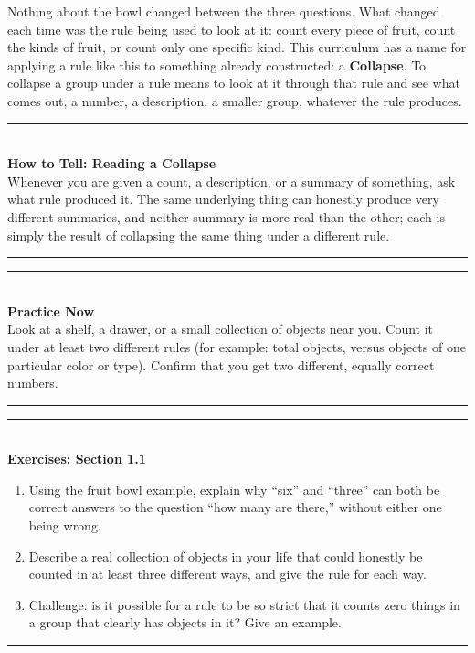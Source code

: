 \documentclass[11pt]{book}
\newenvironment{algorithmproc}[1]{\vspace{0.6em}\noindent\rule{\linewidth}{0.6pt}\\[0.2em]\textbf{How to Tell: #1}\\[0.3em]}{\\[0.2em]\noindent\rule{\linewidth}{0.6pt}\vspace{0.6em}}
\newenvironment{practicenow}{\vspace{0.6em}\noindent\rule{\linewidth}{0.6pt}\\[0.2em]\textbf{Practice Now}\\[0.3em]}{\\[0.2em]\noindent\rule{\linewidth}{0.6pt}\vspace{0.6em}}
\newenvironment{exercisebox}[1]{\vspace{0.8em}\noindent\rule{\linewidth}{0.6pt}\\[0.2em]\textbf{Exercises: #1}\\[0.3em]\begin{enumerate}[label=\arabic*., itemsep=0.4em]}{\end{enumerate}\noindent\rule{\linewidth}{0.6pt}\vspace{0.6em}}
\begin{document}
\begin{center}
\end{center}

Nothing about the bowl changed between the three questions. What changed each time was the rule being used to look at it: count every piece of fruit, count the kinds of fruit, or count only one specific kind. This curriculum has a name for applying a rule like this to something already constructed: a \textbf{Collapse}. To collapse a group under a rule means to look at it through that rule and see what comes out, a number, a description, a smaller group, whatever the rule produces.

\begin{algorithmproc}{Reading a Collapse}
Whenever you are given a count, a description, or a summary of something, ask what rule produced it. The same underlying thing can honestly produce very different summaries, and neither summary is more real than the other; each is simply the result of collapsing the same thing under a different rule.
\end{algorithmproc}

\begin{practicenow}
Look at a shelf, a drawer, or a small collection of objects near you. Count it under at least two different rules (for example: total objects, versus objects of one particular color or type). Confirm that you get two different, equally correct numbers.
\end{practicenow}

\begin{exercisebox}{Section 1.1}
\item Using the fruit bowl example, explain why ``six'' and ``three'' can both be correct answers to the question ``how many are there,'' without either one being wrong.
\item Describe a real collection of objects in your life that could honestly be counted in at least three different ways, and give the rule for each way.
\item Challenge: is it possible for a rule to be so strict that it counts zero things in a group that clearly has objects in it? Give an example.
\end{exercisebox}
\end{document}
